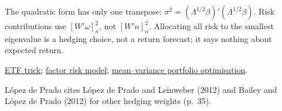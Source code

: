 \begin{qfmodel}
 The quadratic form has only one transpose: $\sigma^2=(\Lambda^{1/2}\beta)'(\Lambda^{1/2}\beta)$. Risk contributions use $[W'\omega]_n^2$, not $[W'n]^2_n$. Allocating all risk to the smallest eigenvalue is a hedging choice, not a return forecast; it says nothing about expected return.

 \hyperref[meth:etf-trick]{ETF trick}; \hyperref[mod:factor-risk-model]{factor risk model}; \hyperref[mod:mean-variance-portfolio-optimisation]{mean--variance portfolio optimisation}.

 López de Prado cites López de Prado and Leinweber (2012) and Bailey and López de Prado (2012) for other hedging weights (p.~35).

\end{qfmodel}

